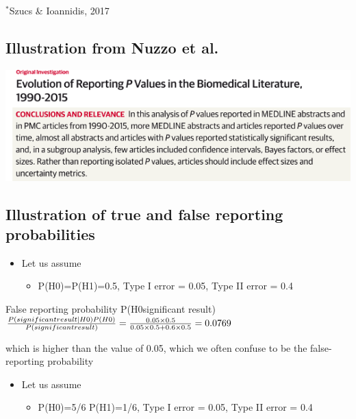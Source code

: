 \documentclass[
]{book}
\providecommand{\tightlist}{%
  \setlength{\itemsep}{0pt}\setlength{\parskip}{0pt}}
\begin{document}
\(^*\)Szucs \& Ioannidis, 2017

\hypertarget{illustration-from-nuzzo-et-al.}{%
\subsection{Illustration from Nuzzo et al.}\label{illustration-from-nuzzo-et-al.}}

\includegraphics[width=1\linewidth]{./6_50}

\hypertarget{illustration-of-true-and-false-reporting-probabilities}{%
\subsection{Illustration of true and false reporting probabilities}\label{illustration-of-true-and-false-reporting-probabilities}}

\begin{itemize}
\tightlist
\item
  Let us assume

  \begin{itemize}
  \tightlist
  \item
    P(H0)=P(H1)=0.5, Type I error = 0.05, Type II error = 0.4
  \end{itemize}
\end{itemize}

False reporting probability P(H0\textbar significant result)\\
\(\frac{P(significant\space result|H0)P(H0)}{P(significant\space result)}=\frac{0.05\times0.5}{0.05\times0.5+0.6\times0.5}=0.0769\)

which is higher than the value of 0.05, which we often confuse to be the false-reporting probability

\begin{itemize}
\tightlist
\item
  Let us assume

  \begin{itemize}
  \tightlist
  \item
    P(H0)=5/6 P(H1)=1/6, Type I error = 0.05, Type II error = 0.4
  \end{itemize}
\end{itemize}
\end{document}
